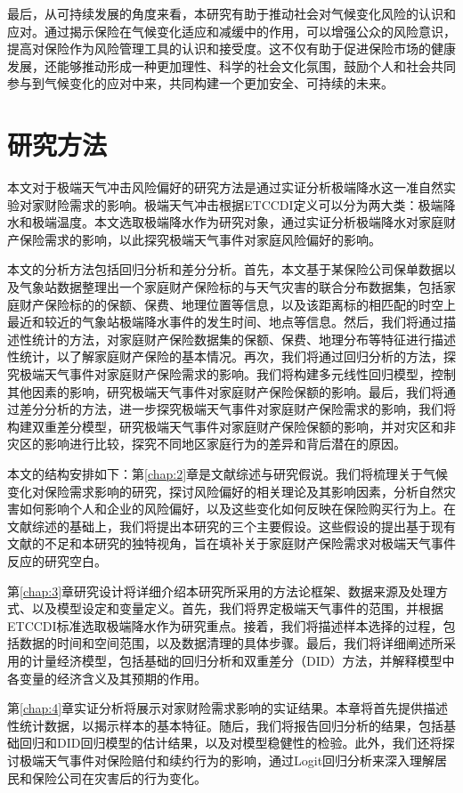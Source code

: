 最后，从可持续发展的角度来看，本研究有助于推动社会对气候变化风险的认识和应对。通过揭示保险在气候变化适应和减缓中的作用，可以增强公众的风险意识，提高对保险作为风险管理工具的认识和接受度。这不仅有助于促进保险市场的健康发展，还能够推动形成一种更加理性、科学的社会文化氛围，鼓励个人和社会共同参与到气候变化的应对中来，共同构建一个更加安全、可持续的未来。
\section{研究方法}
本文对于极端天气冲击风险偏好的研究方法是通过实证分析极端降水这一准自然实验对家财险需求的影响。极端天气冲击根据ETCCDI\citep{alexander2006global}定义可以分为两大类：极端降水和极端温度。本文选取极端降水作为研究对象，通过实证分析极端降水对家庭财产保险需求的影响，以此探究极端天气事件对家庭风险偏好的影响。

本文的分析方法包括回归分析和差分分析。首先，本文基于某保险公司保单数据以及气象站数据整理出一个家庭财产保险标的与天气灾害的联合分布数据集，包括家庭财产保险标的的保额、保费、地理位置等信息，以及该距离标的相匹配的时空上最近和较近的气象站极端降水事件的发生时间、地点等信息。然后，我们将通过描述性统计的方法，对家庭财产保险数据集的保额、保费、地理分布等特征进行描述性统计，以了解家庭财产保险的基本情况。再次，我们将通过回归分析的方法，探究极端天气事件对家庭财产保险需求的影响。我们将构建多元线性回归模型，控制其他因素的影响，研究极端天气事件对家庭财产保险保额的影响。最后，我们将通过差分分析的方法，进一步探究极端天气事件对家庭财产保险需求的影响，我们将构建双重差分模型，研究极端天气事件对家庭财产保险保额的影响，并对灾区和非灾区的影响进行比较，探究不同地区家庭行为的差异和背后潜在的原因。

本文的结构安排如下：第\ref{chap:2}章是文献综述与研究假说。我们将梳理关于气候变化对保险需求影响的研究，探讨风险偏好的相关理论及其影响因素，分析自然灾害如何影响个人和企业的风险偏好，以及这些变化如何反映在保险购买行为上。在文献综述的基础上，我们将提出本研究的三个主要假设。这些假设的提出基于现有文献的不足和本研究的独特视角，旨在填补关于家庭财产保险需求对极端天气事件反应的研究空白。

第\ref{chap:3}章研究设计将详细介绍本研究所采用的方法论框架、数据来源及处理方式、以及模型设定和变量定义。首先，我们将界定极端天气事件的范围，并根据ETCCDI标准选取极端降水作为研究重点。接着，我们将描述样本选择的过程，包括数据的时间和空间范围，以及数据清理的具体步骤。最后，我们将详细阐述所采用的计量经济模型，包括基础的回归分析和双重差分（DID）方法，并解释模型中各变量的经济含义及其预期的作用。

第\ref{chap:4}章实证分析将展示对家财险需求影响的实证结果。本章将首先提供描述性统计数据，以揭示样本的基本特征。随后，我们将报告回归分析的结果，包括基础回归和DID回归模型的估计结果，以及对模型稳健性的检验。此外，我们还将探讨极端天气事件对保险赔付和续约行为的影响，通过Logit回归分析来深入理解居民和保险公司在灾害后的行为变化。

